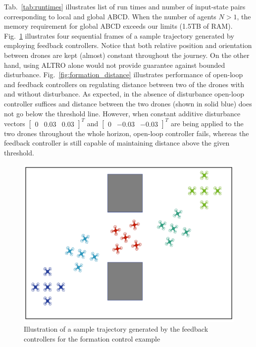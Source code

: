 Tab.~\ref{tab:runtimes} illustrates list of run times and number of input-state pairs corresponding to local and global ABCD. 
When the number of agents $N>1$, the memory requirement for global ABCD exceeds our limits (1.5TB of RAM). 
Fig.~\ref{fig:formation_ex} illustrates four sequential frames of a sample trajectory generated by employing feedback controllers. Notice that both 
relative position and orientation between drones are kept (almost) constant 
throughout the journey. 
On the other hand, using ALTRO alone would not provide guarantee against bounded disturbance. 
Fig.~\ref{fig:formation_distance} illustrates performance of open-loop and feedback controllers on regulating distance between two of the 
drones with and without disturbance. 
As expected, in the absence of disturbance open-loop controller suffices and distance between the two drones (shown in solid blue) does not go below the threshold line. 
However, when constant additive disturbance vectors $\begin{bmatrix}0 &0.03&0.03\end{bmatrix}^T$ and $\begin{bmatrix}0 &-0.03&-0.03\end{bmatrix}^T$ 
are being applied to the two drones throughout the whole horizon, open-loop controller fails, 
whereas the feedback controller is still capable of maintaining distance above the given threshold.

 \begin{figure}[t]
	\centering
	\includegraphics[scale=0.22]{figures/formation.pdf}
	\caption{Illustration of a sample trajectory generated by the feedback controllers for the formation control example}
	\label{fig:formation_ex}
\end{figure}

